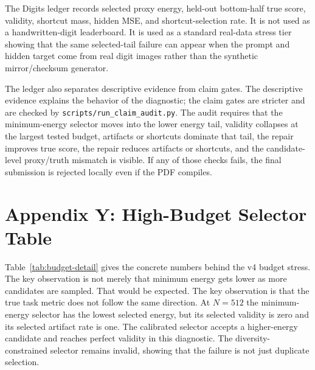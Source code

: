 \documentclass{article}
\begin{document}
The Digits ledger records selected proxy energy, held-out bottom-half true
score, validity, shortcut mass, hidden MSE, and shortcut-selection rate. It is
not used as a handwritten-digit leaderboard. It is used as a standard real-data
stress tier showing that the same selected-tail failure can appear when the
prompt and hidden target come from real digit images rather than the synthetic
mirror/checksum generator.

The ledger also separates descriptive evidence from claim gates. The
descriptive evidence explains the behavior of the diagnostic; the claim gates
are stricter and are checked by \texttt{scripts/run\_claim\_audit.py}. The
audit requires that the minimum-energy selector moves into the lower energy
tail, validity collapses at the largest tested budget, artifacts or shortcuts
dominate that tail, the repair improves true score, the repair reduces
artifacts or shortcuts, and the candidate-level proxy/truth mismatch is
visible. If any of those checks fails, the final submission is rejected locally
even if the PDF compiles.

\section{Appendix Y: High-Budget Selector Table}

Table~\ref{tab:budget-detail} gives the concrete numbers behind the v4 budget
stress. The key observation is not merely that minimum energy gets lower as
more candidates are sampled. That would be expected. The key observation is
that the true task metric does not follow the same direction. At $N=512$ the
minimum-energy selector has the lowest selected energy, but its selected
validity is zero and its selected artifact rate is one. The calibrated selector
accepts a higher-energy candidate and reaches perfect validity in this
diagnostic. The diversity-constrained selector remains invalid, showing that
the failure is not just duplicate selection.
\end{document}
